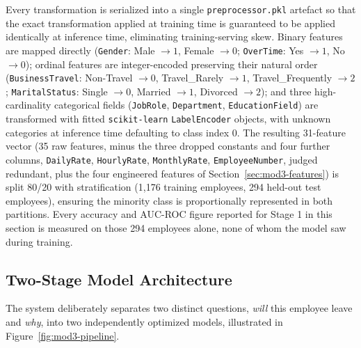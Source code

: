 \documentclass[11pt,a4paper]{article}
\newcommand{\code}[1]{\texttt{\footnotesize #1}}
\begin{document}
Every transformation is serialized into a single \code{preprocessor.pkl} artefact so that the exact transformation applied at training time is guaranteed to be applied identically at inference time, eliminating training-serving skew. Binary features are mapped directly (\code{Gender}: Male $\to 1$, Female $\to 0$; \code{OverTime}: Yes $\to 1$, No $\to 0$); ordinal features are integer-encoded preserving their natural order (\code{BusinessTravel}: Non-Travel $\to 0$, Travel\_Rarely $\to 1$, Travel\_Frequently $\to 2$; \code{MaritalStatus}: Single $\to 0$, Married $\to 1$, Divorced $\to 2$); and three high-cardinality categorical fields (\code{JobRole}, \code{Department}, \code{EducationField}) are transformed with fitted \code{scikit-learn} \code{LabelEncoder} objects, with unknown categories at inference time defaulting to class index 0. The resulting 31-feature vector (35 raw features, minus the three dropped constants and four further columns, \code{DailyRate}, \code{HourlyRate}, \code{MonthlyRate}, \code{EmployeeNumber}, judged redundant, plus the four engineered features of Section~\ref{sec:mod3-features}) is split 80/20 with stratification (1{,}176 training employees, 294 held-out test employees), ensuring the minority class is proportionally represented in both partitions. Every accuracy and AUC-ROC figure reported for Stage 1 in this section is measured on those 294 employees alone, none of whom the model saw during training.

\subsection{Two-Stage Model Architecture}

The system deliberately separates two distinct questions, \emph{will} this employee leave and \emph{why}, into two independently optimized models, illustrated in Figure~\ref{fig:mod3-pipeline}.
\end{document}
